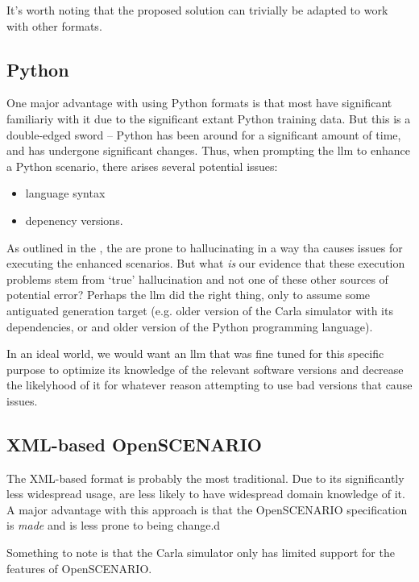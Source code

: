 It's worth noting that the proposed solution can trivially be adapted to work with other formats.

\subsection{Python}

One major advantage with using Python formats is that most  have significant
familiariy with it due to the significant extant Python training data. But this is a double-edged
sword -- Python has been around for a significant amount of time, and has undergone significant
changes. Thus, when prompting the \acrshort{llm} to enhance a Python scenario, there arises several
potential issues: \begin{itemize}
    \item language syntax
    \item depenency versions.
\end{itemize}

As outlined in the , the  are prone to hallucinating in a way tha
causes issues for executing the enhanced scenarios. But what \emph{is} our evidence that these
execution problems stem from `true' hallucination and not one of these other sources of potential
error? Perhaps the \acrshort{llm} did the right thing, only to assume some antiguated generation
target (e.g. older version of the Carla simulator with its dependencies, or and older version of the
Python programming language).

In an ideal world, we would want an \acrshort{llm} that was fine tuned for this specific purpose to
optimize its knowledge of the relevant software versions and decrease the likelyhood of it for
whatever reason attempting to use bad versions that cause issues.

\subsection{XML-based OpenSCENARIO}

The XML-based format is probably the most traditional. Due to its significantly less widespread
usage,  are less likely to have widespread domain knowledge of it. A major advantage
with this approach is that the OpenSCENARIO specification is \emph{made} and is less prone to being
change.d

Something to note is that the Carla simulator only has limited support for the
features of OpenSCENARIO.


